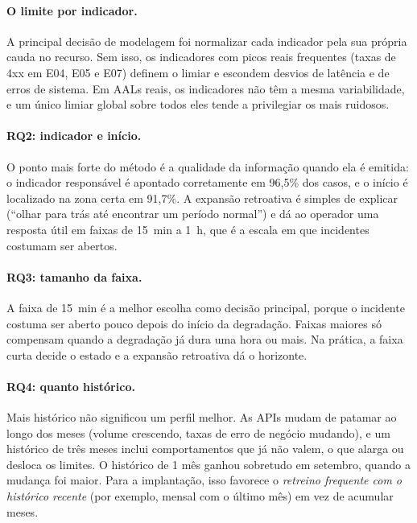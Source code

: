 \documentclass[sigconf,nonacm]{acmart}
\begin{document}
\paragraph{O limite por indicador.} A principal decisão de modelagem foi normalizar cada indicador pela sua própria cauda no recurso. Sem isso, os indicadores com picos reais frequentes (taxas de 4xx em E04, E05 e E07) definem o limiar e escondem desvios de latência e de erros de sistema. Em AALs reais, os indicadores não têm a mesma variabilidade, e um único limiar global sobre todos eles tende a privilegiar os mais ruidosos.

\paragraph{RQ2: indicador e início.} O ponto mais forte do método é a qualidade da informação quando ela é emitida: o indicador responsável é apontado corretamente em 96,5\% dos casos, e o início é localizado na zona certa em 91,7\%. A expansão retroativa é simples de explicar (``olhar para trás até encontrar um período normal'') e dá ao operador uma resposta útil em faixas de 15~min a 1~h, que é a escala em que incidentes costumam ser abertos.

\paragraph{RQ3: tamanho da faixa.} A faixa de 15~min é a melhor escolha como decisão principal, porque o incidente costuma ser aberto pouco depois do início da degradação. Faixas maiores só compensam quando a degradação já dura uma hora ou mais. Na prática, a faixa curta decide o estado e a expansão retroativa dá o horizonte.

\paragraph{RQ4: quanto histórico.} Mais histórico não significou um perfil melhor. As APIs mudam de patamar ao longo dos meses (volume crescendo, taxas de erro de negócio mudando), e um histórico de três meses inclui comportamentos que já não valem, o que alarga ou desloca os limites. O histórico de 1 mês ganhou sobretudo em setembro, quando a mudança foi maior. Para a implantação, isso favorece o \emph{retreino frequente com o histórico recente} (por exemplo, mensal com o último mês) em vez de acumular meses.
\end{document}
